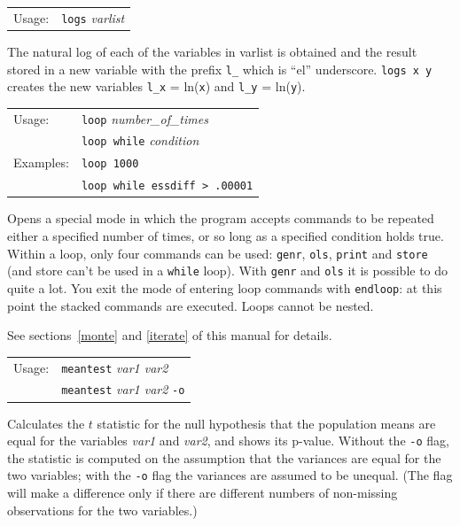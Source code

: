 \documentclass{article}
\begin{document}
{

\begin{tabular}{ll}
Usage:   &    \texttt{logs} \textit{varlist}
\end{tabular}

The natural log of each of the variables in varlist is obtained
and the result stored in a new variable with the prefix \verb+l_+
which is ``el'' underscore.  \texttt{logs x y} creates the new
variables \verb+l_x+ = ln(\texttt{x}) and \verb+l_y+ = ln(\texttt{y}).


\begin{tabular}{ll}
Usage:    &      \texttt{loop} \textit{number\_of\_times}\\
          &      \texttt{loop while} \textit{condition}\\
Examples:   &     \texttt{loop 1000}\\
            &    \verb+loop while essdiff > .00001+
\end{tabular}

Opens a special mode in which the program accepts commands to be
repeated either a specified number of times, or so long as a specified
condition holds true.  Within a loop, only four commands can be used:
\texttt{genr}, \texttt{ols}, \texttt{print} and \texttt{store} (and
store can't be used in a \texttt{while} loop).  With \texttt{genr} and
\texttt{ols} it is possible to do quite a lot.  You exit the mode of
entering loop commands with \texttt{endloop}: at this point the
stacked commands are executed.  Loops cannot be nested.

See sections~\ref{monte} and \ref{iterate} of this manual for details.


\begin{tabular}{ll}
Usage:   &       \texttt{meantest} \textit{var1 var2}\\
         &       \texttt{meantest} \textit{var1 var2} \texttt{-o}
\end{tabular}

Calculates the $t$ statistic for the null hypothesis that the
population means are equal for the variables \textit{var1} and
\textit{var2}, and shows its p-value.  Without the \texttt{-o} flag,
the statistic is computed on the assumption that the variances are
equal for the two variables; with the \texttt{-o} flag the variances
are assumed to be unequal.  (The flag will make a difference only if
there are different numbers of non-missing observations for the two
variables.)

}
\end{document}
